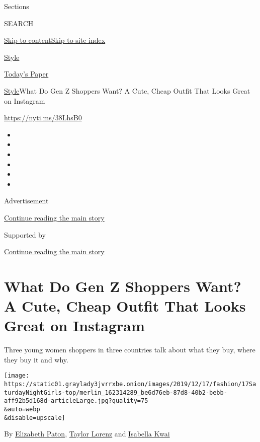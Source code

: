 Sections

SEARCH

\protect\hyperlink{site-content}{Skip to
content}\protect\hyperlink{site-index}{Skip to site index}

\href{https://www.nytimes3xbfgragh.onion/section/style}{Style}

\href{https://myaccount.nytimes3xbfgragh.onion/auth/login?response_type=cookie\&client_id=vi}{}

\href{https://www.nytimes3xbfgragh.onion/section/todayspaper}{Today's
Paper}

\href{/section/style}{Style}\textbar{}What Do Gen Z Shoppers Want? A
Cute, Cheap Outfit That Looks Great on Instagram

\url{https://nyti.ms/38LhsB0}

\begin{itemize}
\item
\item
\item
\item
\item
\item
\end{itemize}

Advertisement

\protect\hyperlink{after-top}{Continue reading the main story}

Supported by

\protect\hyperlink{after-sponsor}{Continue reading the main story}

\hypertarget{what-do-gen-z-shoppers-want-a-cute-cheap-outfit-that-looks-great-on-instagram}{%
\section{What Do Gen Z Shoppers Want? A Cute, Cheap Outfit That Looks
Great on
Instagram}\label{what-do-gen-z-shoppers-want-a-cute-cheap-outfit-that-looks-great-on-instagram}}

Three young women shoppers in three countries talk about what they buy,
where they buy it and why.

\texttt{[image: https://static01.graylady3jvrrxbe.onion/images/2019/12/17/fashion/17SaturdayNightGirls-top/merlin\_162314289\_be6d76eb-87d8-40b2-bebb-aff92b5d168d-articleLarge.jpg?quality=75\\\&auto=webp\\\&disable=upscale]}

By
\href{https://www.nytimes3xbfgragh.onion/by/elizabeth-paton}{Elizabeth
Paton},
\href{https://www.nytimes3xbfgragh.onion/by/taylor-lorenz}{Taylor
Lorenz} and
\href{https://www.nytimes3xbfgragh.onion/by/isabella-kwai}{Isabella
Kwai}

